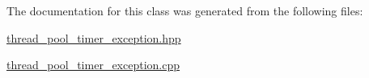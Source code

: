 The documentation for this class was generated from the following files\-:\begin{DoxyCompactItemize}
\item 
\hyperlink{thread__pool__timer__exception_8hpp}{thread\-\_\-pool\-\_\-timer\-\_\-exception.\-hpp}\item 
\hyperlink{thread__pool__timer__exception_8cpp}{thread\-\_\-pool\-\_\-timer\-\_\-exception.\-cpp}\end{DoxyCompactItemize}
